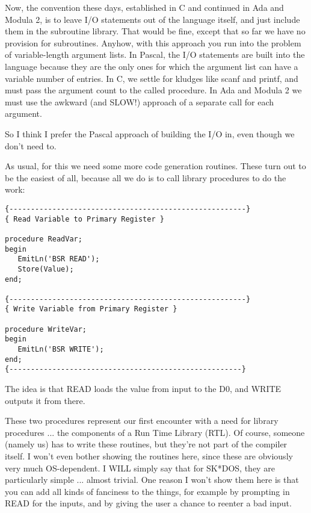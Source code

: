 Now, the convention these days, established in C and continued in Ada and Modula 2, is to leave I/O statements out of  the language itself, and  just  include them in the subroutine library. That would  be  fine, except that so far  we  have  no  provision  for subroutines. Anyhow, with this approach you run into the problem of variable-length argument lists. In Pascal, the I/O statements are built into the language because they are the  only  ones  for which  the  argument  list can have a variable number of entries. In C, we settle for kludges like scanf and printf, and  must pass the argument count to the called procedure. In Ada and  Modula 2 we must use the  awkward  (and SLOW!) approach of a separate call for each argument.

So I think I prefer the  Pascal  approach of building the I/O in, even though we don't need to.

As  usual, for  this we need some more code generation routines. These turn out  to be the easiest of all, because all we do is to call library procedures to do the work:

\begin{verbatim}
{-------------------------------------------------------}
{ Read Variable to Primary Register }

procedure ReadVar;
begin
   EmitLn('BSR READ');
   Store(Value);
end;

{-------------------------------------------------------}
{ Write Variable from Primary Register }

procedure WriteVar;
begin
   EmitLn('BSR WRITE');
end;
{------------------------------------------------------}
\end{verbatim}

The idea is that READ loads the value from input  to  the D0, and WRITE outputs it from there.

These two procedures represent  our  first  encounter with a need for library procedures ... the components of a  Run  Time Library (RTL). Of  course, someone (namely  us)  has  to  write  these routines, but they're not  part  of the compiler itself. I won't even bother  showing the routines here, since these are obviously very much OS-dependent. I   WILL   simply  say that for SK*DOS, they  are  particularly  simple ... almost trivial. One reason I won't show them here is that  you  can add all kinds of fanciness to the things, for  example  by prompting in READ for the inputs, and by giving the user a chance to reenter a bad input.

